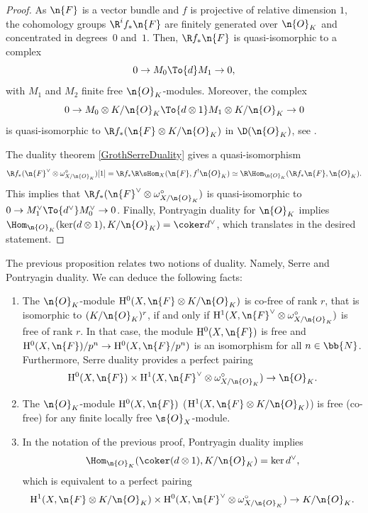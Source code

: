 \begin{proof}
As $\n{F}$ is a vector bundle and $f$ is projective of relative dimension $1$, the cohomology groups $\R^i f_* \n{F}$ are finitely generated over $\n{O}_K$ and concentrated in degrees~$0$ and~$1$. Then, $\R f_* \n{F}$ is quasi-isomorphic to a complex
\[
0 \to M_0 \To{d}M_1\to 0,
\]
with $M_1$ and $M_2$ finite free $\n{O}_K$-modules. Moreover, the complex
\[
0 \to M_0\otimes K/\n{O}_K \To{d\otimes 1} M_1\otimes K/\n{O}_K \to 0
\]
is quasi-isomorphic to $\R f_*(\n{F}\otimes K/\n{O}_K)$ in $\D(\n{O}_K)$, see \cite[Th.\,5.2]{mumford1974abelian}.

The duality theorem \ref{GrothSerreDuality} gives a quasi-isomorphism
\[
\R f_*(\n{F}^{\vee}\otimes \omega^{\circ}_{X/\n{O}_K})[1] =\R f_*\R\sHom_{X}(\n{F}, f^!\n{O}_K)\simeq \R\Hom_{\n{O}_K}(\R f_*\n{F}, \n{O}_K).
\]
This implies that $\R f_* (\n{F}^\vee \otimes \omega_{X/\n{O}_K}^\circ)$ is quasi-isomorphic to $0 \to M_1^\vee \To{d^\vee}M_0^\vee \to 0$. Finally, Pontryagin duality for $\n{O}_K$ implies $\Hom_{\n{O}_K}(\ker(d\otimes 1), K/\n{O}_K)= \coker d^\vee$, which translates in the desired statement.
\end{proof}

\begin{remark}
\label{Remarkduality}
The previous proposition relates two notions of duality. Namely, Serre and Pontryagin duality. We can deduce the following facts:

\begin{enumerate}

\item\label{Remarkduality1} The $\n{O}_K$-module $\mathrm{H}^0(X, \n{F}\otimes K/\n{O}_K)$ is co-free of rank $r$, that is isomorphic to $(K/\n{O}_K)^r$, if and only if $\mathrm{H}^1(X, \n{F}^\vee \otimes \omega_{X/\n{O}_K}^{\circ})$ is free of rank $r$. In that case, the module $\mathrm{H}^0(X, \n{F})$ is free and $\mathrm{H}^0(X, \n{F})/p^n \to \mathrm{H}^0(X,\n{F}/p^n)$ is an isomorphism for all $n\in \bb{N}$. Furthermore, Serre duality provides a perfect pairing
\[
\mathrm{H}^0(X, \n{F}) \times \mathrm{H}^1(X, \n{F}^\vee \otimes \omega^\circ_{X/\n{O}_K})\to \n{O}_K.
\]

\item\label{Remarkduality2} The $\n{O}_K$-module $\mathrm{H}^0(X,\n{F})$ (\resp $\mathrm{H}^1(X, \n{F}\otimes K/\n{O}_K)$) is free (\resp co-free) for any finite locally free $\s{O}_X$-module.

\item\label{Remarkduality3} In the notation of the previous proof, Pontryagin duality implies
\[\Hom_{\n{O}_K}(\coker(d\otimes 1), K/\n{O}_K)=\ker d^{\vee},\]
which is equivalent to a perfect pairing
\[
\mathrm{H}^1(X, \n{F}\otimes K/\n{O}_K) \times \mathrm{H}^0(X,\n{F}^\vee\otimes \omega_{X/\n{O}_K}^\circ)\to K/\n{O}_K.
\]
\end{enumerate}
\end{remark}

